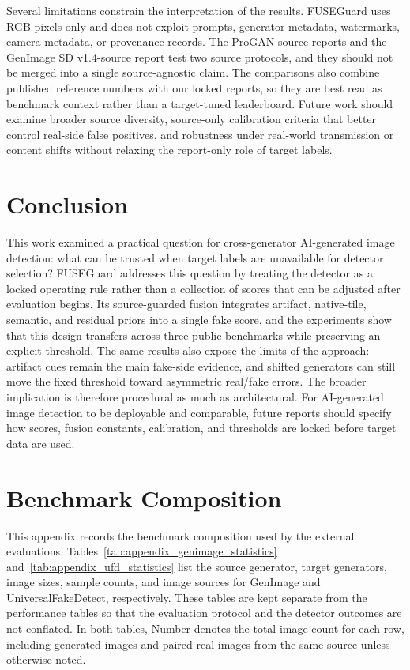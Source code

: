 \documentclass[lettersize,journal]{IEEEtran}
\begin{document}
Several limitations constrain the interpretation of the results. FUSEGuard uses RGB pixels only and does not exploit prompts, generator metadata, watermarks, camera metadata, or provenance records. The ProGAN-source reports and the GenImage SD v1.4-source report test two source protocols, and they should not be merged into a single source-agnostic claim. The comparisons also combine published reference numbers with our locked reports, so they are best read as benchmark context rather than a target-tuned leaderboard. Future work should examine broader source diversity, source-only calibration criteria that better control real-side false positives, and robustness under real-world transmission or content shifts without relaxing the report-only role of target labels.

\section{Conclusion}
\label{sec:conclusion}
This work examined a practical question for cross-generator AI-generated image detection: what can be trusted when target labels are unavailable for detector selection? FUSEGuard addresses this question by treating the detector as a locked operating rule rather than a collection of scores that can be adjusted after evaluation begins. Its source-guarded fusion integrates artifact, native-tile, semantic, and residual priors into a single fake score, and the experiments show that this design transfers across three public benchmarks while preserving an explicit threshold. The same results also expose the limits of the approach: artifact cues remain the main fake-side evidence, and shifted generators can still move the fixed threshold toward asymmetric real/fake errors. The broader implication is therefore procedural as much as architectural. For AI-generated image detection to be deployable and comparable, future reports should specify how scores, fusion constants, calibration, and thresholds are locked before target data are used.

\clearpage
\appendices
\onecolumn
\section{Benchmark Composition}

This appendix records the benchmark composition used by the external evaluations. Tables~\ref{tab:appendix_genimage_statistics} and~\ref{tab:appendix_ufd_statistics} list the source generator, target generators, image sizes, sample counts, and image sources for GenImage and UniversalFakeDetect, respectively. These tables are kept separate from the performance tables so that the evaluation protocol and the detector outcomes are not conflated. In both tables, Number denotes the total image count for each row, including generated images and paired real images from the same source unless otherwise noted.
\end{document}
